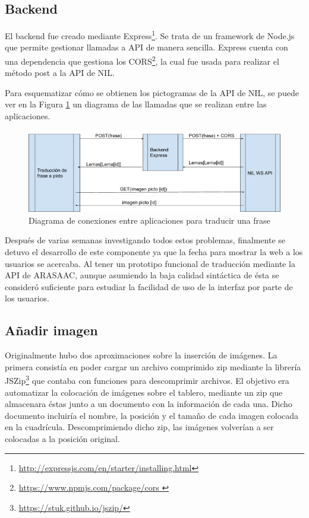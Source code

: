 \subsection{Backend}
\label{backend}

El backend fue creado mediante Express\footnote{\url{http://expressjs.com/en/starter/installing.html}}. Se trata de un framework de Node.js que permite gestionar llamadas a API de manera sencilla. Express cuenta con una dependencia que gestiona los CORS\footnote{\url{https://www.npmjs.com/package/cors }}, la cual fue usada para realizar el método post a la API de NIL. 

Para esquematizar cómo se obtienen los pictogramas de la API de NIL, se puede ver en la Figura \ref{fig:diagramaconexiones} un diagrama de las llamadas que se realizan entre las aplicaciones. 

\begin{figure}[h!]
	\centering
	\includegraphics[width=0.7\linewidth]{Imagenes/Bitmap/diagramaConexiones}
	\caption{Diagrama de conexiones entre aplicaciones para traducir una frase}
	\label{fig:diagramaconexiones}
\end{figure}


Después de varias semanas investigando todos estos problemas, finalmente se detuvo el desarrollo de este componente ya que la fecha para mostrar la web a los usuarios se acercaba. Al tener un prototipo funcional de traducción mediante la API de ARASAAC, aunque asumiendo la baja calidad sintáctica de ésta se consideró suficiente para estudiar la facilidad de uso de la interfaz por parte de los usuarios.




\subsection{Añadir imagen}
\label{cap5:addImageCut}

Originalmente hubo dos aproximaciones sobre la inserción de imágenes. La primera consistía en poder cargar un archivo comprimido zip mediante la librería JSZip\footnote{\url{https://stuk.github.io/jszip/}} que contaba con funciones para descomprimir archivos. El objetivo era automatizar la colocación de imágenes sobre el tablero, mediante un zip que almacenara éstas junto a un documento con la información de cada una. Dicho documento incluiría el nombre, la posición y el tamaño de cada imagen colocada en la cuadrícula. Descomprimiendo dicho zip, las imágenes volverían a ser colocadas a la posición original.

